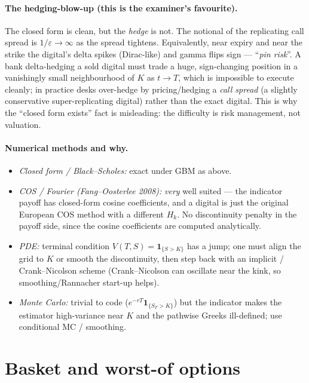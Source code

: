 \documentclass[11pt]{article}
\begin{document}
\paragraph{The hedging-blow-up (this is the examiner's favourite).} The closed form is clean, but the
\emph{hedge} is not. The notional of the replicating call spread is $1/\varepsilon\to\infty$ as the spread
tightens. Equivalently, near expiry and near the strike the digital's delta spikes
(Dirac-like) and gamma flips sign --- ``\emph{pin risk}''. A bank delta-hedging a sold digital must
trade a huge, sign-changing position in a vanishingly small neighbourhood of $K$ as $t\to T$, which is
impossible to execute cleanly; in practice desks over-hedge by pricing/hedging a \emph{call spread}
(a slightly conservative super-replicating digital) rather than the exact digital. This is why the
``closed form exists'' fact is misleading: the difficulty is risk management, not valuation.

\paragraph{Numerical methods and why.}
\begin{itemize}[leftmargin=2em]
\item \emph{Closed form / Black--Scholes:} exact under GBM as above.
\item \emph{COS / Fourier (Fang--Oosterlee 2008):} \emph{very} well suited --- the indicator payoff has
closed-form cosine coefficients, and a digital is just the original European COS method with a
different $H_k$. No discontinuity penalty in the payoff side, since the cosine coefficients are
computed analytically.
\item \emph{PDE:} terminal condition $V(T,S)=\mathbf 1_{\{S>K\}}$ has a jump; one must align the grid
to $K$ or smooth the discontinuity, then step back with an implicit / Crank--Nicolson scheme
(Crank--Nicolson can oscillate near the kink, so smoothing/Rannacher start-up helps).
\item \emph{Monte Carlo:} trivial to code ($e^{-rT}\mathbf 1_{\{S_T>K\}}$) but the indicator makes the
estimator high-variance near $K$ and the pathwise Greeks ill-defined; use conditional MC / smoothing.
\end{itemize}

\section{Basket and worst-of options}
\end{document}
